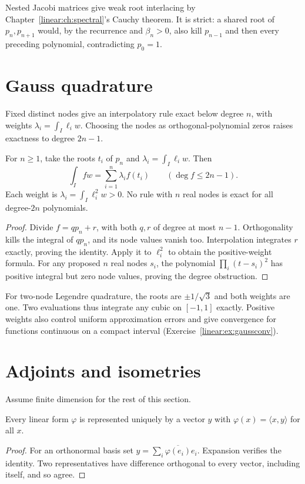 Nested Jacobi matrices give weak root interlacing by Chapter~\ref{linear:ch:spectral}'s Cauchy theorem. It is strict: a shared root of $p_n,p_{n+1}$ would, by the recurrence and $\beta_n>0$, also kill $p_{n-1}$ and then every preceding polynomial, contradicting $p_0=1$.

\section{Gauss quadrature}

Fixed distinct nodes give an interpolatory rule exact below degree $n$, with weights $\lambda_i=\int_I\ell_iw$. Choosing the nodes as orthogonal-polynomial zeros raises exactness to degree $2n-1$.

\begin{theorem}\label{linear:thm:gaussquad}
For $n\ge1$, take the roots $t_i$ of $p_n$ and $\lambda_i=\int_I\ell_iw$. Then
\[\int_Ifw=\sum_{i=1}^n\lambda_if(t_i)\qquad(\deg f\le2n-1).
\]
Each weight is $\lambda_i=\int_I\ell_i^2w>0$. No rule with $n$ real nodes is exact for all degree-$2n$ polynomials.
\end{theorem}
\begin{proof}
Divide $f=qp_n+r$, with both $q,r$ of degree at most $n-1$. Orthogonality kills the integral of $qp_n$, and its node values vanish too. Interpolation integrates $r$ exactly, proving the identity. Apply it to $\ell_i^2$ to obtain the positive-weight formula. For any proposed $n$ real nodes $s_i$, the polynomial $\prod_i(t-s_i)^2$ has positive integral but zero node values, proving the degree obstruction.
\end{proof}

For two-node Legendre quadrature, the roots are $\pm1/\sqrt3$ and both weights are one. Two evaluations thus integrate any cubic on $[-1,1]$ exactly. Positive weights also control uniform approximation errors and give convergence for functions continuous on a compact interval (Exercise~\ref{linear:ex:gaussconv}).

\section{Adjoints and isometries}\label{linear:sec:adjoint}

Assume finite dimension for the rest of this section.
\begin{theorem}\label{linear:thm:riesz}
Every linear form $\varphi$ is represented uniquely by a vector $y$ with $\varphi(x)=\langle x,y\rangle$ for all $x$.
\end{theorem}
\begin{proof}
For an orthonormal basis set $y=\sum_i\overline{\varphi(e_i)}e_i$. Expansion verifies the identity. Two representatives have difference orthogonal to every vector, including itself, and so agree.
\end{proof}


